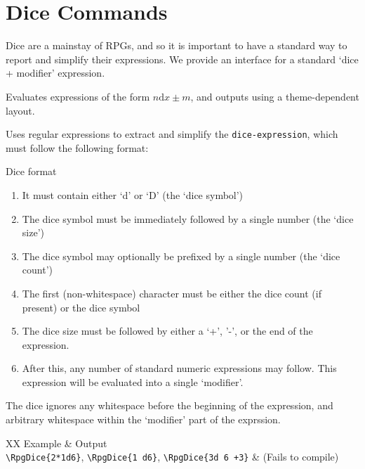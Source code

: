 	\section{Dice Commands}
		Dice are a mainstay of RPGs, and so it is important to have a standard way to report and simplify their expressions. We provide an interface for a standard `dice + modifier' expression.
		\begin{macrolist}
				{\label{Macro:Dice}
					Evaluates expressions of the form $n\mathrm{d}x \pm m$, and outputs using a theme-dependent layout.
				}
				{
				}{
					Uses regular expressions to extract and simplify the \verb|dice-expression|, which must follow the following format:
					\begin{RpgSidebar}{Dice format}
						\begin{multicols}{2}
						\begin{enumerate}
							\item It must contain either `d' or `D' (the `dice symbol')
							\item The dice symbol must be immediately followed by a single number (the `dice size')
							\item The dice symbol may optionally be prefixed by a single number (the `dice count')
							\item The first (non-whitespace) character must be either the dice count (if present) or the dice symbol
							\item The dice size must be followed by either a `+', '-', or the end of the expression.
							\item After this, any number of standard numeric expressions may follow. This expression will be evaluated into a single `modifier'.
						\end{enumerate} 
						\end{multicols}
					\end{RpgSidebar}
					The dice ignores any whitespace before the beginning of the expression, and arbitrary whitespace within the `modifier' part of the exprssion.  
					\begin{RpgTable}{XX}
						Example & Output \\
						\verb|\RpgDice{2*1d6}|, \verb|\RpgDice{1 d6}|, \verb|\RpgDice{3d 6 +3}| & (Fails to compile)
					\end{RpgTable}
				
}
\end{macrolist}
